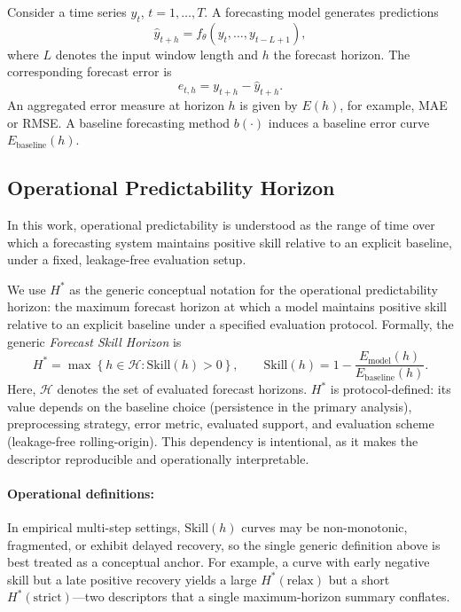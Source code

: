 \documentclass[pdflatex]{sn-jnl}
\begin{document}
Consider a time series $y_t$, $t = 1,\dots,T$.
A forecasting model generates predictions
\begin{equation}
\hat{y}_{t+h} = f_{\theta}(y_t, \dots, y_{t-L+1}),
\end{equation}
where $L$ denotes the input window length and $h$ the forecast horizon.
The corresponding forecast error is
\begin{equation}
e_{t,h} = y_{t+h} - \hat{y}_{t+h}.
\end{equation}
An aggregated error measure at horizon $h$ is given by $E(h)$, for
example, MAE or RMSE. A baseline forecasting method $b(\cdot)$ induces
a baseline error curve $E_{\mathrm{baseline}}(h)$.

\subsection{Operational Predictability Horizon}
In this work, operational predictability is understood as the range of time over which a forecasting system maintains positive skill relative to an explicit baseline, under a fixed, leakage-free evaluation setup.

We use $H^*$ as the generic conceptual notation for the operational predictability horizon: the maximum forecast horizon at which a model maintains positive skill relative to an explicit baseline under a specified evaluation protocol. Formally, the generic \emph{Forecast Skill Horizon} is
\begin{equation}
  H^* = \max \left\{ h \in \mathcal{H} : \mathrm{Skill}(h) > 0 \right\},
  \qquad
  \mathrm{Skill}(h) = 1 - \frac{E_{\mathrm{model}}(h)}{E_{\mathrm{baseline}}(h)}.
\end{equation}
Here, $\mathcal{H}$ denotes the set of evaluated forecast horizons. $H^*$ is protocol-defined: its value depends on the baseline choice (persistence in the primary analysis), preprocessing strategy, error metric, evaluated support, and evaluation scheme (leakage-free rolling-origin). This dependency is intentional, as it makes the descriptor reproducible and operationally interpretable.

\paragraph{Operational definitions:}
In empirical multi-step settings, $\mathrm{Skill}(h)$ curves may be
non-monotonic, fragmented, or exhibit delayed recovery, so the single
generic definition above is best treated as a conceptual anchor.
For example, a curve with early negative skill but a late positive
recovery yields a large $H^*(\mathrm{relax})$ but a short
$H^*(\mathrm{strict})$—two descriptors that a single maximum-horizon
summary conflates.
\end{document}
